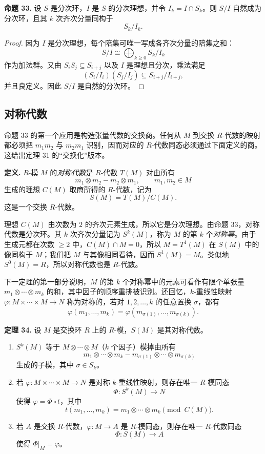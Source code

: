 \noindent\textbf{命题 33.} 设 $S$ 是分次环，$I$ 是 $S$ 的分次理想，并令 $I_k=I\cap S_k$。则 $S/I$ 自然成为分次环，且其 $k$ 次齐次分量同构于
\[
S_k/I_k.
\]

\begin{proof}
因为 $I$ 是分次理想，每个陪集可唯一写成各齐次分量的陪集之和：
\[
S/I\cong\bigoplus_{k\geq0}S_k/I_k
\]
作为加法群。又由 $S_iS_j\subseteq S_{i+j}$ 以及 $I$ 是理想且分次，乘法满足
\[
(S_i/I_i)(S_j/I_j)\subseteq S_{i+j}/I_{i+j},
\]
并且良定义。因此 $S/I$ 是自然的分次环。
\end{proof}

\subsection*{对称代数}

命题 33 的第一个应用是构造张量代数的交换商。任何从 $M$ 到交换 $R$-代数的映射都必须把 $m_1m_2$ 与 $m_2m_1$ 识别，因而对应的 $R$-代数同态必须通过下面定义的商。这给出定理 31 的“交换化”版本。

\noindent\textbf{定义.} $R$-模 $M$ 的\emph{对称代数}是 $R$-代数 $T(M)$ 对由所有
\[
m_1\otimes m_2-m_2\otimes m_1,
\qquad m_1,m_2\in M
\]
生成的理想 $C(M)$ 取商所得的 $R$-代数，记为
\[
S(M)=T(M)/C(M).
\]
这是一个交换 $R$-代数。

理想 $C(M)$ 由次数为 $2$ 的齐次元素生成，所以它是分次理想。由命题 33，对称代数是分次环。其 $k$ 次齐次分量记为 $S^k(M)$，称为 $M$ 的第 $k$ 个\emph{对称幂}。由于生成元都在次数 $\geq2$ 中，$C(M)\cap M=0$，所以 $M=T^1(M)$ 在 $S(M)$ 中的像同构于 $M$；我们把 $M$ 与其像相同看待，因而 $S^1(M)=M$。类似地 $S^0(M)=R$，所以对称代数也是 $R$-代数。

下一定理的第一部分说明，$M$ 的第 $k$ 个对称幂中的元素可看作有限个单张量 $m_1\otimes\cdots\otimes m_k$ 的和，其中因子的顺序重排被识别。还回忆，$k$-重线性映射 $\varphi:M\times\cdots\times M\to N$ 称为对称的，若对 $1,
2,
\ldots,k$ 的任意置换 $\sigma$，都有
\[
\varphi(m_1,
\ldots,m_k)=\varphi(m_{\sigma(1)},
\ldots,m_{\sigma(k)}).
\]

\noindent\textbf{定理 34.} 设 $M$ 是交换环 $R$ 上的 $R$-模，$S(M)$ 是其对称代数。
\begin{enumerate}[label=(\arabic*)]
\item $S^k(M)$ 等于 $M\otimes\cdots\otimes M$（$k$ 个因子）模掉由所有
\[
m_1\otimes\cdots\otimes m_k
-
 m_{\sigma(1)}\otimes\cdots\otimes m_{\sigma(k)}
\]
生成的子模，其中 $\sigma\in S_k$。
\item 若 $\varphi:M\times\cdots\times M\to N$ 是对称 $k$-重线性映射，则存在唯一 $R$-模同态
\[
\Phi:S^k(M)\to N
\]
使得 $\varphi=\Phi\circ t$，其中
\[
t(m_1,
\ldots,m_k)=m_1\otimes\cdots\otimes m_k\pmod{C(M)}.
\]
\item 若 $A$ 是交换 $R$-代数，$\varphi:M\to A$ 是 $R$-模同态，则存在唯一 $R$-代数同态
\[
\Phi:S(M)\to A
\]
使得 $\Phi|_M=\varphi$。
\end{enumerate}

